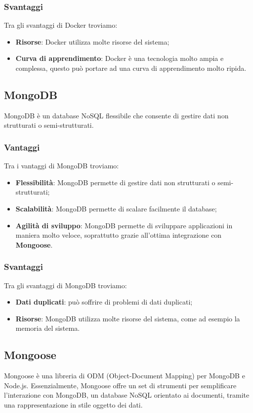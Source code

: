 \subsubsection*{Svantaggi}
Tra gli svantaggi di Docker troviamo:
\begin{itemize}
    \item \textbf{Risorse}: Docker utilizza molte risorse del sistema;
    \item \textbf{Curva di apprendimento}: Docker è una tecnologia molto ampia e complessa, questo può portare ad una curva di apprendimento molto ripida.
\end{itemize}


\subsection*{MongoDB}
MongoDB è un database NoSQL flessibile che consente di gestire dati non strutturati o semi-strutturati. 

\subsubsection*{Vantaggi}
Tra i vantaggi di MongoDB troviamo:
\begin{itemize}
    \item \textbf{Flessibilità}: MongoDB permette di gestire dati non strutturati o semi-strutturati;
    \item \textbf{Scalabilità}: MongoDB permette di scalare facilmente il database;
    \item \textbf{Agilità di sviluppo}: MongoDB permette di sviluppare applicazioni in maniera molto veloce, soprattutto
    grazie all'ottima integrazione con \textbf{Mongoose}.
\end{itemize}

\subsubsection*{Svantaggi}
Tra gli svantaggi di MongoDB troviamo:
\begin{itemize}
    \item \textbf{Dati duplicati}: può soffrire di problemi di dati duplicati;
    \item \textbf{Risorse}: MongoDB utilizza molte risorse del sistema, come ad esempio la memoria del sistema.
\end{itemize}


\subsection*{Mongoose}
Mongoose è una libreria di ODM (Object-Document Mapping) per
MongoDB e Node.js. Essenzialmente, Mongoose offre un set di strumenti
per semplificare l'interazione con MongoDB, un database NoSQL orientato
ai documenti, tramite una rappresentazione in stile oggetto dei dati.

